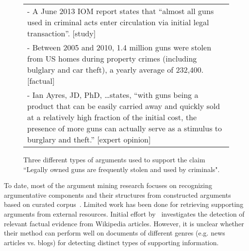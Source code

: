 \begin{figure}[h]
	\fontsize{10}{12}\selectfont
    \setlength{\tabcolsep}{0.8mm}
    
	\begin{tabular}{p{74mm}}

        - A June 2013 IOM report states that ``almost all guns used in criminal acts enter circulation via initial legal transaction''. [study] \\
        - Between 2005 and 2010, 1.4 million guns were stolen from US homes during property crimes (including bulglary and car theft), a yearly average of 232,400. [factual] \\
        - Ian Ayres, JD, PhD, \ldots states, ``with guns being a product that can be easily carried away and quickly sold at a relatively high fraction of the initial cost, the presence of more guns can actually serve as a stimulus to burglary and theft.'' [expert opinion]\\

	\end{tabular}
	\caption{\fontsize{10}{12}\selectfont Three different types of arguments used to support the claim ``Legally owned guns are frequently stolen and used by criminals". }
\label{fig:intro}
\end{figure}

%
To date, most of the argument mining research focuses on recognizing argumentative components and their structures from constructed arguments based on curated corpus~\cite{mochales2011argumentation,stab2014identifying,feng2011classifying,habernal-gurevych:2015:EMNLP,nguyen-litman:2016:P16-1}. Limited work has been done for retrieving supporting arguments from external resources. Initial effort by~ investigates the detection of relevant factual evidence from Wikipedia articles. However, it is unclear whether their method can perform well on documents of different genres (e.g. news articles vs. blogs) for detecting distinct types of supporting information. 


